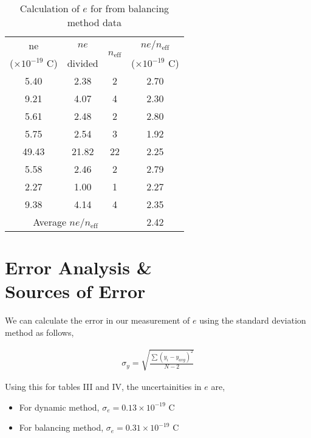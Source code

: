 \begin{table}[H]
    \centering
    \begin{tabular}{|ccc|c|}
    \hline
    \multicolumn{1}{|c|}{ne} & \multicolumn{1}{c|}{$ne$} & \multirow{2}{*}{$n_\text{eff}$} & $ne/n_\text{eff}$ \\ 
    \multicolumn{1}{|c|}{($\times   10^{-19}$ C)} & \multicolumn{1}{c|}{divided} &  & ($\times 10^{-19}$ C) \\ \hline
    \multicolumn{1}{|c|}{5.40} & \multicolumn{1}{c|}{2.38} & 2 & 2.70 \\ \hline
    \multicolumn{1}{|c|}{9.21} & \multicolumn{1}{c|}{4.07} & 4 & 2.30 \\ \hline
    \multicolumn{1}{|c|}{5.61} & \multicolumn{1}{c|}{2.48} & 2 & 2.80 \\ \hline
    \multicolumn{1}{|c|}{5.75} & \multicolumn{1}{c|}{2.54} & 3 & 1.92 \\ \hline
    \multicolumn{1}{|c|}{49.43} & \multicolumn{1}{c|}{21.82} & 22 & 2.25 \\ \hline
    \multicolumn{1}{|c|}{5.58} & \multicolumn{1}{c|}{2.46} & 2 & 2.79 \\ \hline
    \multicolumn{1}{|c|}{2.27} & \multicolumn{1}{c|}{1.00} & 1 & 2.27 \\ \hline
    \multicolumn{1}{|c|}{9.38} & \multicolumn{1}{c|}{4.14} & 4 & 2.35 \\ \hline
    \multicolumn{3}{|c|}{Average $ne/n_\text{eff}$} & 2.42 \\ \hline
    \end{tabular}
    \caption{Calculation of $e$ for from balancing method data}
\end{table}


\section{Error Analysis \&\\ Sources of Error}

We can calculate the error in our measurement of $e$ using the standard deviation method as follows,

\begin{align}
    \sigma_y = \sqrt{\frac{\sum (y_i - y_{avg})^2}{N-2}}
\end{align}

Using this for tables III and IV, the uncertainities in $e$ are,
\begin{itemize}
    \item For dynamic method, $\sigma_e=0.13\times 10^{-19}$ C
    \item For balancing method, $\sigma_e=0.31\times 10^{-19}$ C
\end{itemize}

